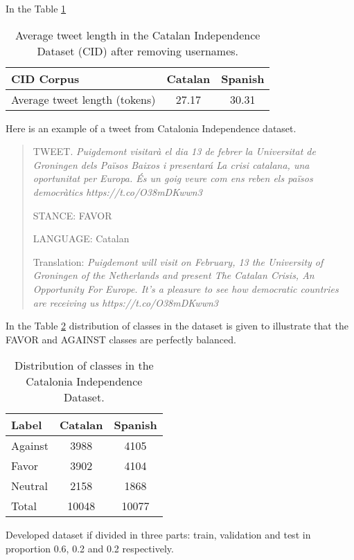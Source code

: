 \documentclass[10pt, a4paper]{article}
\begin{document}
In the Table \ref{tab:length_ind_dataset}

\begin{table}[!ht]
\centering
\begin{tabular}{lcc} \hline
CID Corpus & Catalan & Spanish \\ \hline
Average tweet length (tokens)& 27.17 & 30.31 \\ \hline
\end{tabular}
\caption{Average tweet length in the Catalan Independence Dataset (CID) after removing usernames.}\label{tab:length_ind_dataset}
\end{table}

Here is an example of a tweet from Catalonia Independence dataset.

\begin{quote}
TWEET. \textit{Puigdemont visitar\`a el dia 13 de febrer la Universitat de Groningen dels Pa\"isos Baixos i presentar\'a  La crisi catalana, una oportunitat per Europa. \'Es un goig veure com ens reben els pa\"isos democr\`atics https://t.co/O38mDKwwn3}

STANCE: FAVOR

LANGUAGE: Catalan

Translation: \textit{Puigdemont will visit
on February, 13 the University of Groningen of the Netherlands and present The Catalan Crisis, An Opportunity For Europe.
It's a pleasure to see how democratic countries are receiving us https://t.co/O38mDKwwn3}
\end{quote}

In the Table \ref{tab:distr_dataset} distribution of classes in the dataset is given to illustrate that the FAVOR and AGAINST classes are perfectly balanced.


\begin{table}[!ht]
\centering
\begin{tabular}{lcc}\hline
Label & Catalan & Spanish \\ \hline
Against & 3988 & 4105 \\
Favor & 3902 & 4104 \\
Neutral & 2158 & 1868 \\ \hline
Total & 10048 & 10077 \\ \hline
\end{tabular}
\caption{Distribution of classes in the Catalonia Independence Dataset.}\label{tab:distr_dataset}
\end{table}

Developed dataset if divided in three parts: train, validation and  test in proportion 0.6, 0.2 and 0.2 respectively.
\end{document}
